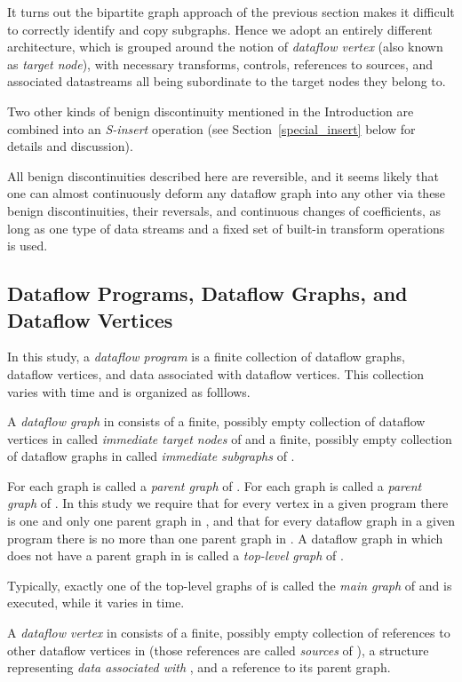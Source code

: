 \documentclass{llncs}
\begin{document}
It turns out the bipartite graph approach of the previous section makes it difficult
to correctly identify and copy subgraphs. Hence we adopt an entirely different
architecture, which is grouped around the notion of
{\em dataflow vertex} (also known as {\em target node}), with necessary transforms, controls, references
to sources, and associated datastreams all being subordinate to the target nodes
they belong to.

Two other kinds of benign discontinuity mentioned in the Introduction are combined
into an {\em S-insert} operation (see Section~\ref{special_insert} below for details
and discussion).

All benign discontinuities described here are reversible, and it seems likely that
one can almost continuously deform any dataflow graph into any other via
these benign discontinuities, their reversals, and continuous changes of
coefficients, as long as one type of data streams and a fixed set of built-in
transform operations is used.

\subsection{Dataflow Programs, Dataflow Graphs, and Dataflow Vertices}

In this study, a {\em dataflow program}  is a finite collection of dataflow graphs, dataflow vertices, 
and data associated with dataflow vertices. This collection varies with time and is organized as folllows.

A {\em dataflow graph}  in  consists of a finite, possibly empty collection  of dataflow vertices in  called {\em immediate target nodes} of
 and a finite, possibly empty collection  of dataflow graphs in  called {\em immediate subgraphs} of .

For each  graph  is called a {\em parent graph} of . For each  graph  is called a {\em parent graph} of . 
In this study we require that for every vertex  in a given program  there is one and only one parent graph in , and that for every
dataflow graph  in a given program  there is no more than one parent graph in .  A dataflow graph  in  which does not
have a parent graph in  is called a {\em top-level graph} of .

Typically, exactly one of the top-level graphs of  is called the {\em main graph} of  and is executed, while it varies in time.

A {\em dataflow vertex}  in  consists of a finite, possibly empty collection of references to other dataflow vertices in  (those references
are called {\em sources} of ), a structure representing {\em data associated with} , and a reference to its parent graph.
\end{document}

